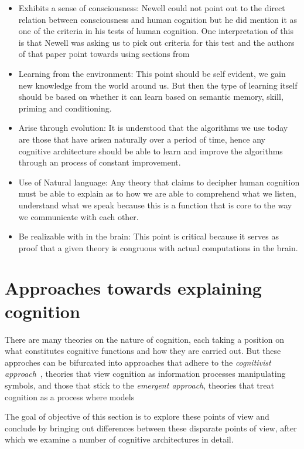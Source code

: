 \begin{itemize}
\item Exhibits a sense of consciousness: Newell could not point out to
  the direct relation between consciousness and human cognition but he
  did mention it as one of the criteria in his tests of human
  cognition. One interpretation of
  this~\cite{CambridgeJournals:207162} is that Newell was asking us to
  pick out criteria for this test and the authors of that paper point
  towards using sections from \cite{Cohen:1996aa}

\item Learning from the environment: This point should be self
evident, we gain new knowledge from the world around us. But then
the type of learning itself should be based on whether it can learn based on
semantic memory, skill, priming and conditioning.

\item Arise through evolution: It is understood that the algorithms we
use today are those that have arisen naturally over a period of time,
hence any cognitive architecture should be able to learn and improve
the algorithms through an process of constant improvement.

\item Use of Natural language: Any theory that claims to decipher human
cognition must be able to explain as to how we are able to comprehend
what we listen, understand what we speak because this is a function
that is core to the way we communicate with each other.

\item Be realizable with in the brain: This point is critical because
it serves as proof that a given theory is congruous with actual
computations in the brain.

\end{itemize}
\section{Approaches towards explaining cognition}
    There are many theories on the nature of cognition, each
    taking a position on what constitutes cognitive functions and how
    they are carried out. But these approches can be bifurcated into
    approaches that adhere to the \emph{cognitivist
    approach}~\cite{DBLP:journals/tec/VernonMS07}, theories
    that view cognition as information processes manipulating symbols,
    and those that stick to the \emph{emergent approach}, theories
    that treat cognition as a process where models 


    The goal of objective of this section is to explore these points
    of view and conclude by bringing out differences between these
    disparate points of view, after which we examine a number of
    cognitive architectures in detail.
